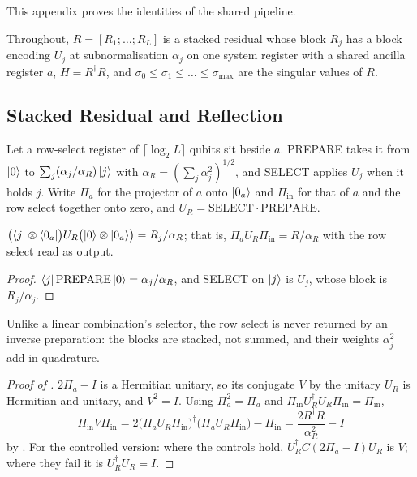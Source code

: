 This appendix proves the identities of the shared pipeline.

Throughout, $R=[R_1;\dots;R_L]$ is a stacked residual whose block $R_j$ has a block encoding $U_j$ at subnormalisation $\alpha_j$ on one system register with a shared ancilla register $a$, $H=R^\dagger R$, and $\sigma_0\le\sigma_1\le\dots\le\sigma_{\max}$ are the singular values of $R$.

\subsection{Stacked Residual and Reflection}
\label{app:proof-stacked-reflection}

Let a row-select register of $\lceil\log_2L\rceil$ qubits sit beside $a$. PREPARE takes it from $\ket0$ to $\sum_j(\alpha_j/\alpha_R)\ket j$ with $\alpha_R=(\sum_j\alpha_j^2)^{1/2}$, and SELECT applies $U_j$ when it holds $j$. Write $\Pi_a$ for the projector of $a$ onto $\ket{0_a}$ and $\Pi_{\mathrm{in}}$ for that of $a$ and the row select together onto zero, and $U_R=\mathrm{SELECT}\cdot\mathrm{PREPARE}$.

\begin{lemma}
\label{lem:stack}
$\bigl(\bra j\otimes\bra{0_a}\bigr)U_R\bigl(\ket0\otimes\ket{0_a}\bigr)=R_j/\alpha_R$; that is, $\Pi_aU_R\Pi_{\mathrm{in}}=R/\alpha_R$ with the row select read as output.
\end{lemma}
\begin{proof}
$\bra j\mathrm{PREPARE}\ket0=\alpha_j/\alpha_R$, and SELECT on $\ket j$ is $U_j$, whose block is $R_j/\alpha_j$.
\end{proof}

Unlike a linear combination's selector, the row select is never returned by an inverse preparation: the blocks are stacked, not summed, and their weights $\alpha_j^2$ add in quadrature.

\begin{proof}[Proof of ]
$2\Pi_a-I$ is a Hermitian unitary, so its conjugate $V$ by the unitary $U_R$ is Hermitian and unitary, and $V^2=I$. Using $\Pi_a^2=\Pi_a$ and $\Pi_{\mathrm{in}}U_R^\dagger U_R\Pi_{\mathrm{in}}=\Pi_{\mathrm{in}}$,
\begin{equation*}
    \Pi_{\mathrm{in}}V\Pi_{\mathrm{in}}
    =2\bigl(\Pi_aU_R\Pi_{\mathrm{in}}\bigr)^\dagger\bigl(\Pi_aU_R\Pi_{\mathrm{in}}\bigr)-\Pi_{\mathrm{in}}
    =\frac{2R^\dagger R}{\alpha_R^2}-I
\end{equation*}
by . For the controlled version: where the controls hold, $U_R^\dagger C(2\Pi_a-I)U_R$ is $V$; where they fail it is $U_R^\dagger U_R=I$.
\end{proof}

